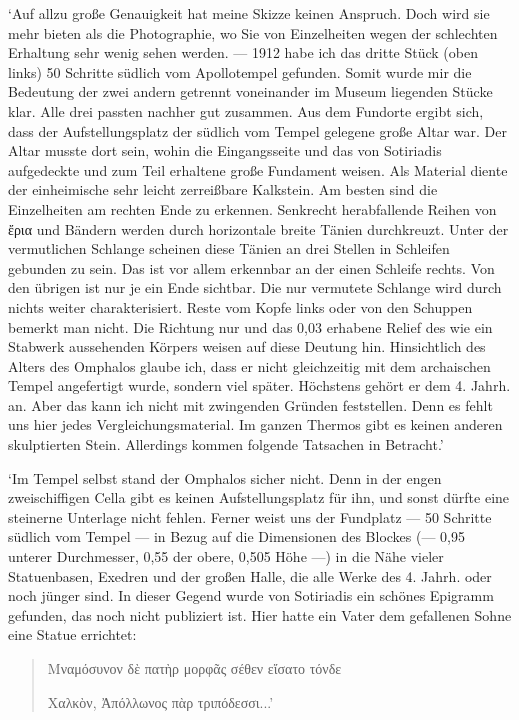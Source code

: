 \documentclass[a4paper, 11pt, oneside]{article}
\begin{document}
`Auf allzu große Genauigkeit hat meine Skizze keinen Anspruch. Doch wird sie mehr bieten als die Photographie, wo Sie von Einzelheiten wegen der schlechten Erhaltung sehr wenig sehen werden. --- 1912 habe ich das dritte Stück (oben links) 50 Schritte südlich vom Apollotempel gefunden. Somit wurde mir die Bedeutung der zwei andern getrennt voneinander im Museum liegenden Stücke klar. Alle drei passten nachher gut zusammen. Aus dem Fundorte ergibt sich, dass der Aufstellungsplatz der südlich vom Tempel gelegene große Altar war. Der Altar musste dort sein, wohin die Eingangsseite und das von Sotiriadis aufgedeckte und zum Teil erhaltene große Fundament weisen. Als Material diente der einheimische sehr leicht zerreißbare Kalkstein. Am besten sind die Einzelheiten am rechten Ende zu erkennen. Senkrecht herabfallende Reihen von ἔρια und Bändern werden durch horizontale breite Tänien durchkreuzt. Unter der vermutlichen Schlange scheinen diese Tänien an drei Stellen in Schleifen gebunden zu sein. Das ist vor allem erkennbar an der einen Schleife rechts. Von den übrigen ist nur je ein Ende sichtbar. Die nur vermutete Schlange wird durch nichts weiter charakterisiert. Reste vom Kopfe links oder von den Schuppen bemerkt man nicht. Die Richtung nur und das 0,03 erhabene Relief des wie ein Stabwerk aussehenden Körpers weisen auf diese Deutung hin. Hinsichtlich des Alters des Omphalos glaube ich, dass er nicht gleichzeitig mit dem archaischen Tempel angefertigt wurde, sondern viel später. Höchstens gehört er dem 4. Jahrh. an. Aber das kann ich nicht mit zwingenden Gründen feststellen. Denn es fehlt uns hier jedes Vergleichungsmaterial. Im ganzen Thermos gibt es keinen anderen skulptierten Stein. Allerdings kommen folgende Tatsachen in Betracht.'

`Im Tempel selbst stand der Omphalos sicher nicht. Denn in der engen zweischiffigen Cella gibt es keinen Aufstellungsplatz für ihn, und sonst dürfte eine steinerne Unterlage nicht fehlen. Ferner weist uns der Fundplatz --- 50 Schritte südlich vom Tempel --- in Bezug auf die Dimensionen des Blockes (--- 0,95 unterer Durchmesser, 0,55 der obere, 0,505 Höhe ---) in die Nähe vieler Statuenbasen, Exedren und der großen Halle, die alle Werke des 4. Jahrh. oder noch jünger sind. In dieser Gegend wurde von Sotiriadis ein schönes Epigramm gefunden, das noch nicht publiziert ist. Hier hatte ein Vater dem gefallenen Sohne eine Statue errichtet:
\begin{quotation}
Μναμόσυνον δὲ πατὴρ μορφᾶς σέθεν εἴσατο τόνδε

\hspace*{5mm}Χαλκὸν, Ἀπόλλωνος πὰρ τριπόδεσσι...'
\end{quotation}
\end{document}
